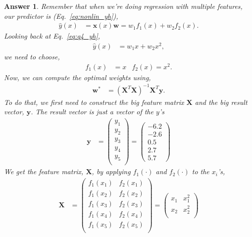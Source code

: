 \documentclass{article}
\newtheorem{answer}{Answer}
\newcommand{\bracket}[3]{\left#1 #3 \right#2}
\renewcommand{\b}{\bracket{(}{)}}
\newcommand{\x}{\mathbf{x}}
\newcommand{\y}{\mathbf{y}}
\newcommand{\X}{\mathbf{X}}
\newcommand{\w}{\mathbf{w}}
\newcommand{\wo}{\w^*}
\begin{document}
\begin{answer}
  Remember that when we're doing regression with multiple features, our predictor is (Eq.~\ref{eq:nonlin_yh}),
  \begin{align}
    \hat{y}(x) &= \x(x) \w = w_1 f_1(x) + w_2 f_2(x).
  \end{align}
  Looking back at Eq.~\eqref{eq:q4_yh},
  \begin{align}
    \hat{y}(x) &= w_1 x + w_2 x^2,
  \end{align}
  we need to choose,
  \begin{align}
    f_1(x) & = x & f_2(x) = x^2.
  \end{align}
  Now, we can compute the optimal weights using,
  \begin{align}
    \wo &= \b{\X^T \X}^{-1} \X^T \y.
  \end{align}
  To do that, we first need to construct the big feature matrix $\X$ and the big result vector, $\y$.
  The result vector is just a vector of the $y$'s
  \begin{align}
    \y &= \begin{pmatrix}
      y_1\\
      y_2\\
      y_3\\
      y_4\\
      y_5\\
    \end{pmatrix}
    = \begin{pmatrix}
      -6.2\\
      -2.6\\
       0.5\\
       2.7\\
       5.7
    \end{pmatrix}
  \end{align}
  We get the feature matrix, $\X$, by applying $f_1(\cdot)$ and $f_2(\cdot)$ to the $x_i$'s,
  \begin{align}
    \X &= \begin{pmatrix}
      f_1(x_1) & f_2(x_1)\\
      f_1(x_2) & f_2(x_2)\\
      f_1(x_3) & f_2(x_3)\\
      f_1(x_4) & f_2(x_4)\\
      f_1(x_5) & f_2(x_5)\\
    \end{pmatrix}
    = \begin{pmatrix}
      x_1 & x_1^2\\
      x_2 & x_2^2\\

\end{pmatrix}
\end{align}
\end{answer}
\end{document}
